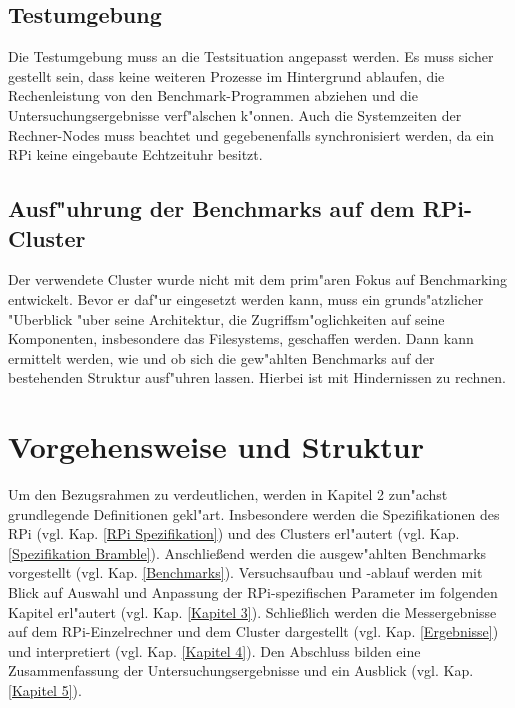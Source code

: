 \subsection{Testumgebung}\label{Testumgebung}

Die Testumgebung muss an die Testsituation angepasst werden. Es muss sicher gestellt sein, dass keine weiteren Prozesse im Hintergrund ablaufen, die Rechenleistung von den Benchmark-Programmen abziehen und die Untersuchungsergebnisse verf"alschen k"onnen. Auch die Systemzeiten der Rechner-Nodes muss beachtet und gegebenenfalls synchronisiert werden, da ein RPi keine eingebaute Echtzeituhr besitzt. 

\subsection{Ausf"uhrung der Benchmarks auf dem RPi-Cluster}\label{Anpassung Cluster}

Der verwendete Cluster wurde nicht mit dem prim"aren Fokus auf Benchmarking entwickelt. Bevor er daf"ur eingesetzt werden kann, muss ein grunds"atzlicher "Uberblick "uber seine Architektur, die Zugriffsm"oglichkeiten auf seine Komponenten, insbesondere das Filesystems, geschaffen werden. Dann kann ermittelt werden, wie und ob sich die gew"ahlten Benchmarks auf der bestehenden Struktur ausf"uhren lassen. Hierbei ist mit Hindernissen zu rechnen. 

\section{Vorgehensweise und Struktur}\label{Struktur}

Um den Bezugsrahmen zu verdeutlichen, werden in Kapitel 2 zun"achst grundlegende Definitionen gekl"art. Insbesondere werden die Spezifikationen des RPi (vgl. Kap. \ref{RPi Spezifikation}) und des Clusters erl"autert (vgl. Kap. \ref{Spezifikation Bramble}). Anschlie\ss end werden die ausgew"ahlten Benchmarks vorgestellt (vgl. Kap. \ref{Benchmarks}). Versuchsaufbau und -ablauf werden mit Blick auf Auswahl und Anpassung der RPi-spezifischen Parameter im folgenden Kapitel erl"autert (vgl. Kap. \ref{Kapitel 3}). Schlie\ss lich  werden die Messergebnisse auf dem RPi-Einzelrechner und dem Cluster dargestellt (vgl. Kap. \ref{Ergebnisse}) und interpretiert (vgl. Kap. \ref{Kapitel 4}). Den Abschluss bilden eine Zusammenfassung der Untersuchungsergebnisse und ein Ausblick (vgl. Kap. \ref{Kapitel 5}).

\endinput 
